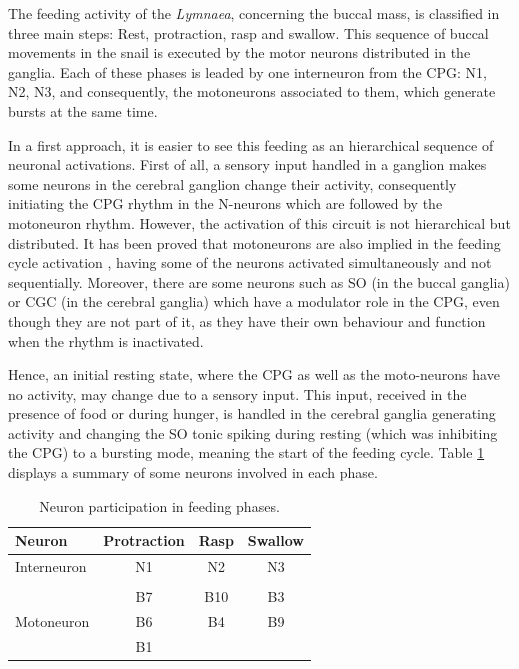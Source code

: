 The feeding activity of the \textit{Lymnaea}, concerning the buccal mass, is classified in three main steps: Rest, protraction, rasp and swallow. This sequence of buccal movements in the snail is executed by the motor neurons distributed in the ganglia. Each of these phases is leaded by one interneuron from the CPG: N1, N2, N3, and consequently, the motoneurons associated to them, which generate bursts at the same time. 

In a first approach, it is easier to see this feeding as an hierarchical sequence of neuronal activations. First of all, a sensory input handled in a ganglion makes some neurons in the cerebral ganglion change their activity, consequently initiating the CPG rhythm in the N-neurons which are followed by the motoneuron rhythm. However, the activation of this circuit is not hierarchical but distributed. It has been proved that motoneurons are also implied in the feeding cycle activation \cite{Staras1998}, having some of the neurons activated simultaneously and not sequentially. Moreover, there are some neurons such as SO (in the buccal ganglia) or CGC (in the cerebral ganglia) which have a modulator role in the CPG, even though they are not part of it, as they have their own behaviour and function when the rhythm is inactivated. 


Hence, an initial resting state, where the CPG as well as the moto-neurons have no activity, may change due to a sensory input. This input, received in the presence of food or during hunger, is handled in the cerebral ganglia generating activity and changing the SO tonic spiking during resting (which was inhibiting the CPG) to a bursting mode, meaning the start of the feeding cycle. Table \ref{table:tabla spikes} displays a summary of some neurons involved in each phase. 


\begin{table}[h!]
	\centering
	\begin{tabular}{lccc}
		Neuron                                           & \multicolumn{1}{l}{Protraction} & \multicolumn{1}{l}{Rasp} & \multicolumn{1}{l}{Swallow} \\ \hline
		Interneuron                                     & N1                              & N2                       & N3                          \\
		& \multicolumn{1}{l}{}            & \multicolumn{1}{l}{}     & \multicolumn{1}{l}{}        \\
		\multicolumn{1}{c}{\multirow{3}{*}{Motoneuron}} & B7                              & B10                      & B3                        \\
		\multicolumn{1}{c}{}                            & B6                              & B4                       & B9                        \\
		\multicolumn{1}{c}{}                            & B1                              &                          &                         
	\end{tabular}
	\caption{Neuron participation in feeding phases.}
	\label{table:tabla spikes}
\end{table}



